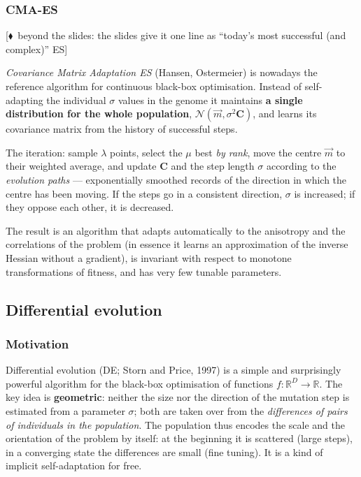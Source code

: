 \documentclass[11pt,a4paper]{article}
\theoremstyle{definition}
\providecommand{\uv}[1]{``#1''}
\newcommand{\mimoq}[1]{\textcolor{markcol}{\textsf{\footnotesize[$\blacklozenge$~beyond the slides: #1]}}}
\begin{document}
\subsubsection{CMA-ES}

\noindent\mimoq{the slides give it one line as \uv{today's most successful (and complex)} ES}

\begin{defbox}
\emph{Covariance Matrix Adaptation ES} (Hansen, Ostermeier) is nowadays the reference
algorithm for continuous black-box optimisation. Instead of self-adapting the individual
$\sigma$ values in the genome it maintains \textbf{a single distribution for the whole
population}, $\mathcal{N}(\vec m, \sigma^2 \mathbf{C})$, and learns its covariance matrix
from the history of successful steps.

The iteration: sample $\lambda$ points, select the $\mu$ best \emph{by rank}, move the centre
$\vec m$ to their weighted average, and update $\mathbf{C}$ and the step length $\sigma$
according to the \emph{evolution paths} --- exponentially smoothed records of the direction
in which the centre has been moving. If the steps go in a consistent direction, $\sigma$ is
increased; if they oppose each other, it is decreased.
\end{defbox}

The result is an algorithm that adapts automatically to the anisotropy and the correlations
of the problem (in essence it learns an approximation of the inverse Hessian without a
gradient), is invariant with respect to monotone transformations of fitness, and has very few
tunable parameters.

\subsection{Differential evolution}
\label{sec:de}
\subsubsection{Motivation}

Differential evolution (DE; Storn and Price, 1997) is a simple and surprisingly
powerful algorithm for the black-box optimisation of functions
$f: \mathbb{R}^D \to \mathbb{R}$. The key idea is \textbf{geometric}: neither
the size nor the direction of the mutation step is estimated from a parameter
$\sigma$; both are taken over from the \emph{differences of pairs of individuals
in the population}. The population thus encodes the scale and the orientation of
the problem by itself: at the beginning it is scattered (large steps), in a
converging state the differences are small (fine tuning). It is a kind of
implicit self-adaptation for free.
\end{document}
